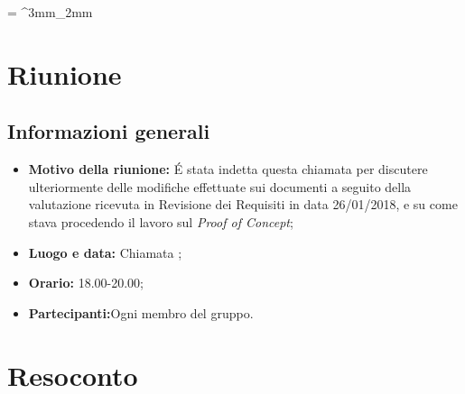 \documentclass[VER-2018-05-02.tex]{subfiles}
\begin{document}
\tabulinesep = ^3mm_2mm
\chapter{Riunione}
\section{Informazioni generali}
\begin{itemize}
	\item \textbf{Motivo della riunione:} \'{E} stata indetta questa chiamata  per discutere ulteriormente delle modifiche effettuate sui documenti a seguito della valutazione ricevuta in Revisione dei Requisiti in data 26/01/2018, e su come stava procedendo il lavoro sul \textit{Proof of Concept};
	\item \textbf{Luogo e data:} Chiamata ;
	\item \textbf{Orario:} 18.00-20.00;
	\item \textbf{Partecipanti:}Ogni membro del gruppo.
\end{itemize}


\chapter{Resoconto}
\end{document}
